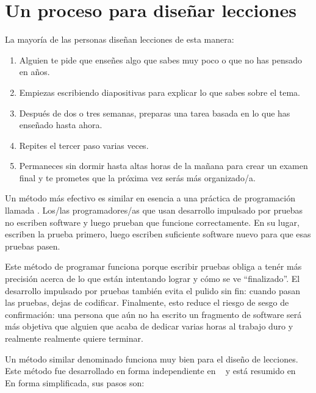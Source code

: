 \chapter{Un proceso para diseñar lecciones}\label{s:process}

La mayoría de las personas diseñan lecciones de esta manera:
\begin{enumerate}

 \item
Alguien te pide que enseñes algo que sabes muy poco o que no has pensado en años.

 \item
Empiezas escribiendo diapositivas para explicar lo que sabes sobre el tema.

 \item
Después de dos o tres semanas,
preparas una tarea basada en lo que has enseñado hasta ahora.
 \item
Repites el tercer paso varias veces.
 \item
Permaneces sin dormir hasta altas horas de la mañana
para crear un examen final
y te prometes que la próxima vez serás más organizado/a.
\end{enumerate}

Un método más efectivo es similar en esencia a una práctica de programación llamada .
Los/las programadores/as que usan desarrollo impulsado por pruebas no escriben software
y luego prueban que funcione correctamente.
En su lugar,
escriben la prueba primero,
luego escriben suficiente software nuevo para que esas pruebas pasen.
 
Este método de programar funciona porque escribir pruebas obliga a
tenér más precisión acerca de lo que están intentando lograr y cómo se ve ``finalizado''.
El desarrollo impulsado por pruebas también evita el pulido sin fin:
cuando pasan las pruebas, dejas de codificar.
Finalmente,
esto reduce el riesgo de sesgo de confirmación:
una persona que aún no ha escrito un fragmento de software
será más objetiva que alguien que acaba de dedicar varias horas al trabajo duro y realmente realmente quiere terminar.
 
Un método similar denominado  funciona muy bien para el diseño de lecciones.
Este método fue desarrollado en forma independiente en ~\cite{Wigg2005,Bigg2011,Fink2013} y está resumido en~\cite{McTi2013}
En forma simplificada, sus pasos son:
 

